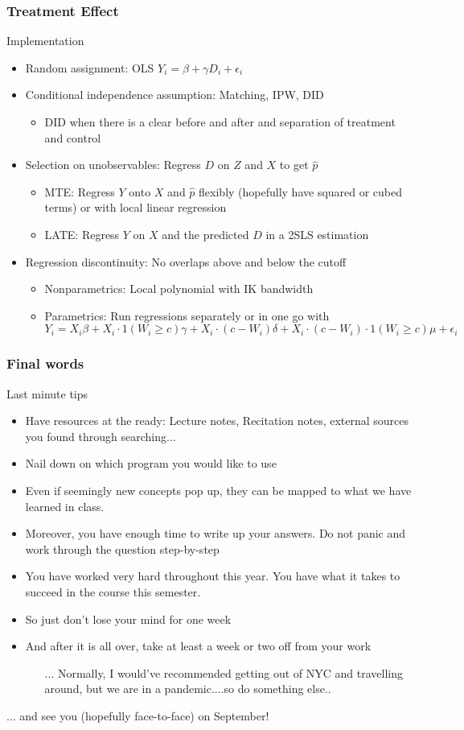 \documentclass{beamer}
\begin{document}
\begin{frame}
\frametitle{Treatment Effect}
Implementation
\begin{itemize}
\item  Random assignment: OLS $Y_i=\beta+\gamma D_i+\epsilon_i$
\item Conditional independence assumption: Matching, IPW, DID
\begin{itemize}
\item DID when there is a clear before and after and separation of treatment and control
\end{itemize}
\item Selection on unobservables: Regress $D$ on $Z$ and $X$ to get $\hat{p}$
\begin{itemize}
\item MTE: Regress $Y$ onto $X$ and $\hat{p}$ flexibly (hopefully have squared or cubed terms) or with local linear regression
\item LATE: Regress $Y$ on $X$ and the predicted $D$ in a 2SLS estimation
\end{itemize}
\item Regression discontinuity: No overlaps above and below the cutoff
\begin{itemize}
\item Nonparametrics: Local polynomial with IK bandwidth 
\item Parametrics: Run regressions separately or in one go with
\small{\[
Y_i=X_i\beta + X_i\cdot 1(W_i\geq c)\gamma+X_i\cdot (c-W_i)\delta+ X_i\cdot (c-W_i)\cdot 1(W_i\geq c)\mu+\epsilon_i
\]}\normalsize
\end{itemize}
\end{itemize}
\end{frame}

\begin{frame}
\frametitle{Final words}
Last minute tips
\begin{itemize}
\item Have resources at the ready: Lecture notes, Recitation notes, external sources you found through searching...
\item Nail down on which program you would like to use
\item Even if seemingly new concepts pop up, they can be mapped to what we have learned in class.
\item Moreover, you have enough time to write up your answers. Do not panic and work through the question step-by-step
\item You have worked very hard throughout this year. You have what it takes to succeed in the course this semester. 
\item So just don't lose your mind for one week
\item And after it is all over, take at least a week or two off from your work
\scriptsize{\begin{itemize}
\item[...] Normally, I would've recommended getting out of NYC and travelling around, but we are in a pandemic....so do something else..
\end{itemize}}
\end{itemize}
\end{frame}

\begin{frame}
\centering
\LARGE{... and see you (hopefully face-to-face) on September!}
\end{frame}
\end{document}
